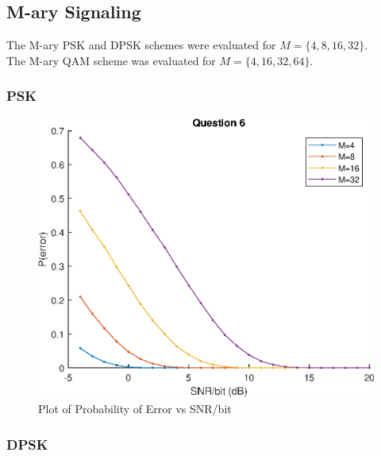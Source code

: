 \documentclass[12pt]{report}
\begin{document}
\newpage

\subsection{M-ary Signaling}

The M-ary PSK and DPSK schemes were evaluated for $M = \{ 4, 8, 16, 32 \}$. \\
The M-ary QAM scheme was evaluated for $M = \{ 4, 16, 32, 64 \}$.

\subsubsection{PSK}

\begin{figure}[!htb]
    \begin{center}
    \includegraphics[scale=1]{Question6}
    \caption{Plot of Probability of Error vs SNR/bit}
    \end{center}
\end{figure}

\newpage

\subsubsection{DPSK}
\end{document}
